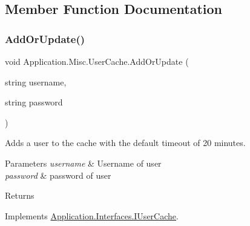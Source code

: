 \subsection{Member Function Documentation}
\mbox{\label{class_application_1_1_misc_1_1_user_cache_ab56ecb52b9a7bc855729b439a5c5bb36}} 
\subsubsection{\texorpdfstring{Add\+Or\+Update()}{AddOrUpdate()}\hspace{0.1cm}{\footnotesize\ttfamily [1/2]}}
{\footnotesize\ttfamily void Application.\+Misc.\+User\+Cache.\+Add\+Or\+Update (\begin{DoxyParamCaption}\item[{string}]{username,  }\item[{string}]{password }\end{DoxyParamCaption})}



Adds a user to the cache with the default timeout of 20 minutes. 


\begin{DoxyParams}{Parameters}
{\em username} & Username of user\\
\hline
{\em password} & password of user\\
\hline
\end{DoxyParams}
\begin{DoxyReturn}{Returns}

\end{DoxyReturn}


Implements \mbox{\hyperlink{interface_application_1_1_interfaces_1_1_i_user_cache_a607deb5ebf1cfb0f237daf9981206d73}{Application.\+Interfaces.\+I\+User\+Cache}}.

\mbox{\label{class_application_1_1_misc_1_1_user_cache_a7c8d6acdc76809a72a36db8ba8fdd8f8}} 
